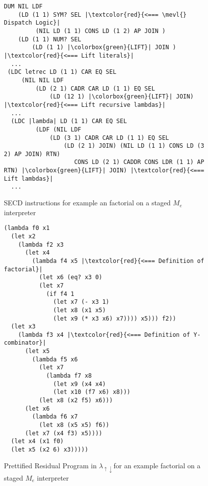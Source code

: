 \documentclass[a4paper,12pt,twoside,openright]{report}
\theoremstyle{definition}
\newcommand{\mslang}{$\lambda_{\uparrow\downarrow}$}
\newcommand{\mevl}{$M_{e}$}
\begin{document}
\begin{figure}[htp!]
\centering
         \begin{verbatim}
DUM NIL LDF
    (LD (1 1) SYM? SEL |\textcolor{red}{<=== \mevl{} Dispatch Logic}|
         (NIL LD (1 1) CONS LD (1 2) AP JOIN )
    (LD (1 1) NUM? SEL
        (LD (1 1) |\colorbox{green}{LIFT}| JOIN ) |\textcolor{red}{<=== Lift literals}|
  ...
 (LDC letrec LD (1 1) CAR EQ SEL
     (NIL NIL LDF
         (LD (2 1) CADR CAR LD (1 1) EQ SEL
             (LD (12 1) |\colorbox{green}{LIFT}| JOIN) |\textcolor{red}{<=== Lift recursive lambdas}|
  ...
  (LDC |lambda| LD (1 1) CAR EQ SEL
         (LDF (NIL LDF
             (LD (3 1) CADR CAR LD (1 1) EQ SEL
                 (LD (2 1) JOIN) (NIL LD (1 1) CONS LD (3 2) AP JOIN) RTN)
                    CONS LD (2 1) CADDR CONS LDR (1 1) AP RTN) |\colorbox{green}{LIFT}| JOIN) |\textcolor{red}{<=== Lift lambdas}|
  ...
         \end{verbatim}
\caption{SECD instructions for example an factorial on a staged \mevl{} interpreter}
\label{lst:mevl_staged_secd_ops}
\end{figure}

\begin{figure}[htp!]
\centering
     \begin{verbatim}
(lambda f0 x1
  (let x2
    (lambda f2 x3
      (let x4
        (lambda f4 x5 |\textcolor{red}{<=== Definition of factorial}|
          (let x6 (eq? x3 0)
          (let x7
            (if f4 1
              (let x7 (- x3 1)
              (let x8 (x1 x5)
              (let x9 (* x3 x6) x7)))) x5))) f2))
  (let x3
    (lambda f3 x4 |\textcolor{red}{<=== Definition of Y-combinator}|
      (let x5
        (lambda f5 x6
          (let x7
            (lambda f7 x8
              (let x9 (x4 x4)
              (let x10 (f7 x6) x8)))
          (let x8 (x2 f5) x6)))
      (let x6
        (lambda f6 x7
          (let x8 (x5 x5) f6))
      (let x7 (x4 f3) x5))))
  (let x4 (x1 f0)
  (let x5 (x2 6) x3)))))
         \end{verbatim}
         \caption{Prettified Residual Program in \mslang for an example factorial on a staged \mevl{} interpreter}
         \label{lst:mevl_staged_secd_ped}
\end{figure}
\newpage

\end{document}
